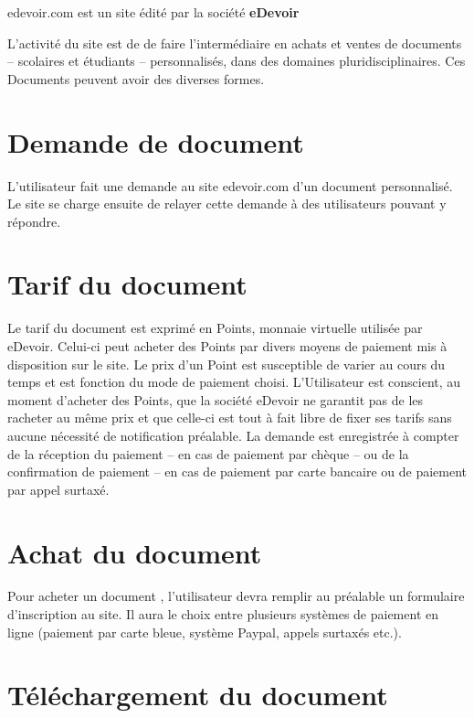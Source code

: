 \maketitle

edevoir.com est un site édité par la société \textbf{eDevoir}

L'activité du site est de de faire l'intermédiaire en achats et ventes de documents -- scolaires et étudiants -- personnalisés, dans des domaines pluridisciplinaires. Ces Documents peuvent avoir des diverses formes.

\section{Demande de document}

L'utilisateur fait une demande au site edevoir.com d'un document personnalisé. Le site se charge ensuite de relayer cette demande à des utilisateurs pouvant y répondre.

\section{Tarif du document}

Le tarif du document est exprimé en Points, monnaie virtuelle utilisée par eDevoir. Celui-ci peut acheter des Points par divers moyens de paiement mis à disposition sur le site. Le prix d'un Point est susceptible de varier au cours du temps et est fonction du mode de paiement choisi. L'Utilisateur est conscient, au moment d'acheter des Points, que la société eDevoir ne garantit pas de les racheter au même prix et que celle-ci est tout à fait libre de fixer ses tarifs sans aucune nécessité de notification préalable.
La demande est enregistrée à compter de la réception du paiement -- en cas de paiement par chèque -- ou de la confirmation de paiement -- en cas de paiement par carte bancaire ou de paiement par appel surtaxé.

\section{Achat du document}

Pour acheter un document , l'utilisateur devra remplir au préalable un formulaire d'inscription au site. Il aura le choix entre plusieurs systèmes de paiement en ligne (paiement par carte bleue, système Paypal, appels surtaxés etc.).

\section{Téléchargement du document}

